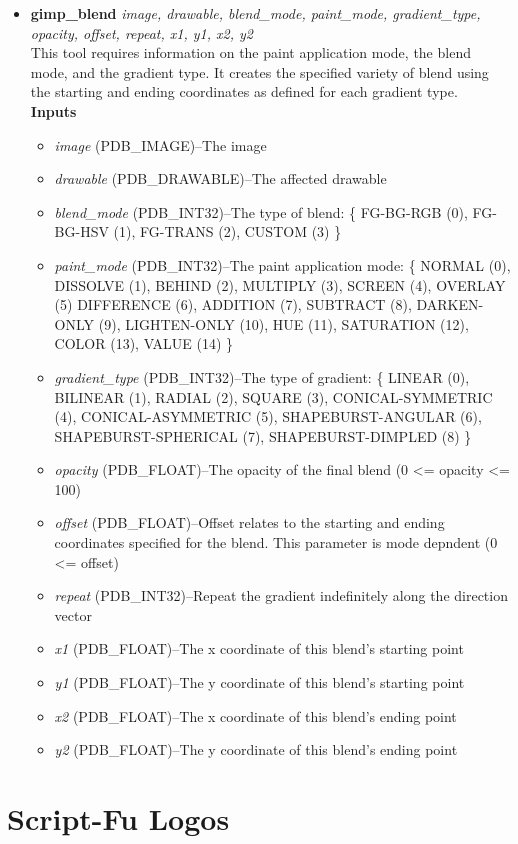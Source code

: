 \documentclass{article}
\begin{document}
\begin{itemize}
\item {\scriptsize{\bf gimp\_blend} {\it image, drawable, blend\_mode, paint\_mode, gradient\_type, opacity, offset, repeat, x1, y1, x2, y2}\\
This tool requires information on the paint application mode, the
blend mode, and the gradient type.  It creates the specified variety
of blend using the starting and ending coordinates as defined for each
gradient type.\\
\bf Inputs \rm
\begin{itemize}
\item {\it image} (PDB\_IMAGE)--The image
\item {\it drawable} (PDB\_DRAWABLE)--The affected drawable
\item {\it blend\_mode} (PDB\_INT32)--The type of blend: \{ FG-BG-RGB (0), FG-BG-HSV (1), FG-TRANS (2), CUSTOM (3) \}
\item {\it paint\_mode} (PDB\_INT32)--The paint application mode: \{ NORMAL (0), DISSOLVE (1), BEHIND (2), MULTIPLY (3), SCREEN (4), OVERLAY (5) DIFFERENCE (6), ADDITION (7), SUBTRACT (8), DARKEN-ONLY (9), LIGHTEN-ONLY (10), HUE (11), SATURATION (12), COLOR (13), VALUE (14) \}
\item {\it gradient\_type} (PDB\_INT32)--The type of gradient: \{ LINEAR (0), BILINEAR (1), RADIAL (2), SQUARE (3), CONICAL-SYMMETRIC (4), CONICAL-ASYMMETRIC (5), SHAPEBURST-ANGULAR (6), SHAPEBURST-SPHERICAL (7), SHAPEBURST-DIMPLED (8) \}
\item {\it opacity} (PDB\_FLOAT)--The opacity of the final blend (0 <= opacity <= 100)
\item {\it offset} (PDB\_FLOAT)--Offset relates to the starting and ending coordinates specified for the blend.  This parameter is mode depndent (0 <= offset)
\item {\it repeat} (PDB\_INT32)--Repeat the gradient indefinitely along the direction vector
\item {\it x1} (PDB\_FLOAT)--The x coordinate of this blend's starting point
\item {\it y1} (PDB\_FLOAT)--The y coordinate of this blend's starting point
\item {\it x2} (PDB\_FLOAT)--The x coordinate of this blend's ending point
\item {\it y2} (PDB\_FLOAT)--The y coordinate of this blend's ending point
\end{itemize}}
\end{itemize}
\onecolumn

\section{Script-Fu Logos}
\end{document}
